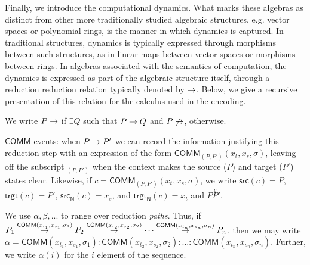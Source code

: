 Finally, we introduce the computational dynamics. What marks these
algebras as distinct from other more traditionally studied algebraic
structures, e.g. vector spaces or polynomial rings, is the manner in
which dynamics is captured. In traditional structures, dynamics is typically
expressed through morphisms between such structures, as in linear maps
between vector spaces or morphisms between rings. In algebras
associated with the semantics of computation, the dynamics is
expressed as part of the algebraic structure itself, through a
reduction reduction relation typically denoted by $\rightarrow$. Below, we
give a recursive presentation of this relation for the calculus used
in the encoding.


We write $P\rightarrow$ if $\exists Q $ such that $ P \rightarrow Q$ and $P\not\rightarrow$, otherwise.

\begin{definition}
  $\mathsf{COMM}$-events: when $P \rightarrow P'$ we can record the information
  justifying this reduction step with an expression of the form
  $\mathsf{COMM}_{(P,P')}(x_t,x_s,\sigma)$, leaving off the subscript
  $_{(P,P')}$ when the context makes the source ($P$) and target
  ($P'$) states clear. Likewise, if $c = \mathsf{COMM}_{(P,P')}(x_t,x_s,\sigma)$, we write $\mathsf{src}(c) = P$, $\mathsf{trgt}(c) = P'$, $\mathsf{src_{N}}(c) = x_{s}$, and $\mathsf{trgt_{N}}(c) = x_{t}$ and $P \stackrel{c} P'$.
\end{definition}

We use $\alpha, \beta, ...$ to range over reduction
\emph{paths}. Thus, if $P_{1} \stackrel{\mathsf{COMM}(x_{t_{1}},x_{s_{1}},\sigma_{1})}{\rightarrow} P_{2} \stackrel{\mathsf{COMM}(x_{t_{2}},x_{s_{2}},\sigma_{2})}{\rightarrow} \cdots \stackrel{\mathsf{COMM}(x_{t_{n}},x_{s_{n}},\sigma_{n})}{\rightarrow} P_{n}$,
then we may write $\alpha = \mathsf{COMM}(x_{t_{1}},x_{s_{1}},\sigma_{1}):\mathsf{COMM}(x_{t_{2}},x_{s_{2}},\sigma_{2}):\ldots : \mathsf{COMM}(x_{t_{n}},x_{s_{n}},\sigma_{n})$. Further, we write
$\alpha(i)$ for the $i$ element of the sequence.

